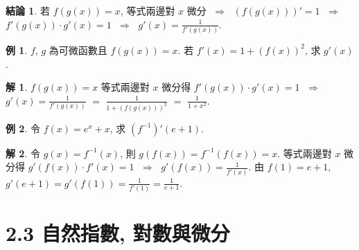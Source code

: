 \documentclass[12pt]{extarticle}
\newcommand{\ds}{\displaystyle}
\newcommand{\ie}{\;\Longrightarrow\;}
\theoremstyle{definition}
\newtheorem*{fact}{結論}
\newtheorem*{ex}{例}
\newtheorem*{sol}{解}
\begin{document}
\begin{fact}
  若 $f(g(x)) = x$, 等式兩邊對 $x$ 微分 $\ie$ $\ds(f(g(x)))' = 1$ $\ie$ $\ds f'(g(x))\cdot g'(x) = 1$ $\ie$ $\ds g'(x) = \frac{1}{f'(g(x))}$.   
\end{fact}

\begin{ex}
  $f$, $g$ 為可微函數且 $\ds f(g(x)) = x$. 若 $\ds f'(x) = 1 + (f(x))^2$, 求 $g'(x)$.   
\end{ex}

\begin{sol}
  $\ds f(g(x)) = x$ 等式兩邊對 $x$ 微分得 $\ds f'(g(x))\cdot g'(x) = 1$ $\ie$ $\ds g'(x) = \frac{1}{f'(g(x))}$ $=$ $\ds\frac{1}{1 + (f(g(x)))^2}$ $=$ $\ds\frac{1}{1 + x^2}$. 
\end{sol}

\begin{ex}
  令 $\ds f(x) = e^x + x$, 求 $\ds (f^{-1})'(e + 1)$. 
\end{ex}

\begin{sol}
  令 $\ds g(x) = f^{-1}(x)$, 則 $\ds g(f(x)) = f^{-1}(f(x)) = x$. 等式兩邊對 $x$ 微分得 $\ds g'(f(x))\cdot f'(x) = 1$ $\ie$ $\ds g'(f(x)) = \frac{1}{f'(x)}$. 由 $f(1) = e + 1$, $\ds g'(e + 1) = g'(f(1)) = \frac{1}{f'(1)} = \frac{1}{e + 1}$. 
\end{sol}

%

\section*{2.3 自然指數, 對數與微分}
\end{document}
